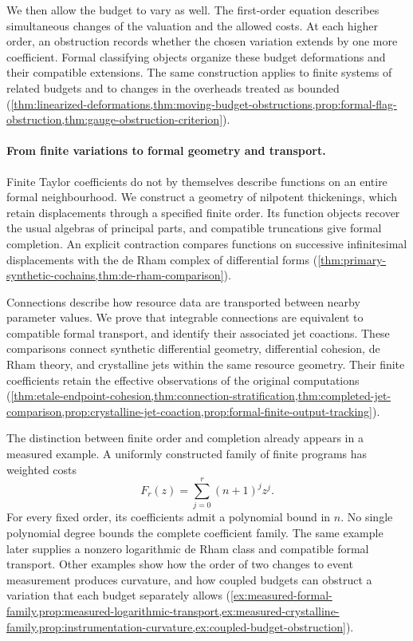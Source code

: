 \documentclass[11pt,a4paper]{article}
\numberwithin{algorithm}{section}
\numberwithin{equation}{section}
\theoremstyle{definition}
\theoremstyle{remark}
\theoremstyle{plain}
\theoremstyle{definition}
\theoremstyle{plain}
\begin{document}
We then allow the budget to vary as well. The first-order equation
describes simultaneous changes of the valuation and the allowed costs.
At each higher order, an obstruction records whether the chosen
variation extends by one more coefficient. Formal classifying objects
organize these budget deformations and their compatible extensions.
The same construction applies to finite systems of related budgets
and to changes in the overheads treated as bounded
(\cref{thm:linearized-deformations,thm:moving-budget-obstructions,prop:formal-flag-obstruction,thm:gauge-obstruction-criterion}).

\paragraph{From finite variations to formal geometry and transport.}
Finite Taylor coefficients do not by themselves describe functions on
an entire formal neighbourhood. We construct a geometry of nilpotent
thickenings, which retain displacements through a specified finite
order. Its function objects recover the usual algebras of principal
parts, and compatible truncations give formal completion. An explicit
contraction compares functions on successive infinitesimal
displacements with the de Rham complex of differential forms
(\cref{thm:primary-synthetic-cochains,thm:de-rham-comparison}).

Connections describe how resource data are transported between nearby
parameter values. We prove that integrable connections are equivalent
to compatible formal transport, and identify their associated jet
coactions. These comparisons connect synthetic differential geometry,
differential cohesion, de Rham theory, and crystalline jets within the
same resource geometry. Their finite coefficients retain the
effective observations of the original computations
(\cref{thm:etale-endpoint-cohesion,thm:connection-stratification,thm:completed-jet-comparison,prop:crystalline-jet-coaction,prop:formal-finite-output-tracking}).

The distinction between finite order and completion already appears
in a measured example. A uniformly constructed family of finite
programs has weighted costs
\[
 F_r(z)=\sum_{j=0}^r(n+1)^jz^j.
\]
For every fixed order, its coefficients admit a polynomial bound in
$n$. No single polynomial degree bounds the complete coefficient
family. The same example later supplies a nonzero logarithmic de Rham
class and compatible formal transport. Other examples show how the
order of two changes to event measurement produces curvature, and how
coupled budgets can obstruct a variation that each budget separately
allows
(\cref{ex:measured-formal-family,prop:measured-logarithmic-transport,ex:measured-crystalline-family,prop:instrumentation-curvature,ex:coupled-budget-obstruction}).
\end{document}

